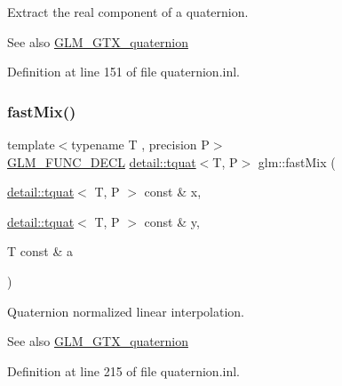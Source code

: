 Extract the real component of a quaternion.

\begin{DoxySeeAlso}{See also}
\hyperlink{group__gtx__quaternion}{G\+L\+M\+\_\+\+G\+T\+X\+\_\+quaternion} 
\end{DoxySeeAlso}


Definition at line 151 of file quaternion.\+inl.

\mbox{\label{group__gtx__quaternion_ga5d1bb2670d0c73fff5912134ba7c024c}} 
\subsubsection{\texorpdfstring{fast\+Mix()}{fastMix()}}
{\footnotesize\ttfamily template$<$typename T , precision P$>$ \\
\hyperlink{setup_8hpp_ab2d052de21a70539923e9bcbf6e83a51}{G\+L\+M\+\_\+\+F\+U\+N\+C\+\_\+\+D\+E\+CL} \hyperlink{structglm_1_1detail_1_1tquat}{detail\+::tquat}$<$T, P$>$ glm\+::fast\+Mix (\begin{DoxyParamCaption}\item[{\hyperlink{structglm_1_1detail_1_1tquat}{detail\+::tquat}$<$ T, P $>$ const \&}]{x,  }\item[{\hyperlink{structglm_1_1detail_1_1tquat}{detail\+::tquat}$<$ T, P $>$ const \&}]{y,  }\item[{T const \&}]{a }\end{DoxyParamCaption})}

Quaternion normalized linear interpolation.

\begin{DoxySeeAlso}{See also}
\hyperlink{group__gtx__quaternion}{G\+L\+M\+\_\+\+G\+T\+X\+\_\+quaternion} 
\end{DoxySeeAlso}


Definition at line 215 of file quaternion.\+inl.

\mbox{\label{group__gtx__quaternion_ga96cb50103d939ea50d8b80bc898b2a35}} 
